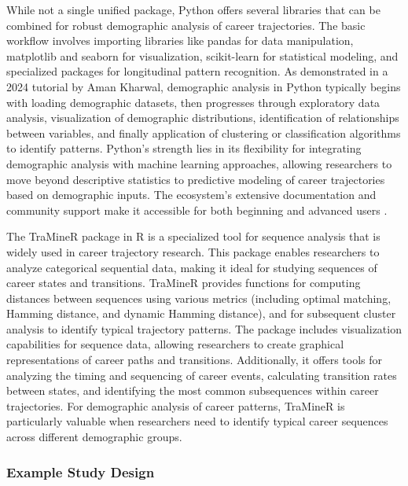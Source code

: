 \documentclass[../main.tex]{subfiles}
\begin{document}
While not a single unified package, Python offers several libraries that can be combined for robust demographic analysis of career trajectories. The basic workflow involves importing libraries like pandas for data manipulation, matplotlib and seaborn for visualization, scikit-learn for statistical modeling, and specialized packages for longitudinal pattern recognition. As demonstrated in a 2024 tutorial by Aman Kharwal, demographic analysis in Python typically begins with loading demographic datasets, then progresses through exploratory data analysis, visualization of demographic distributions, identification of relationships between variables, and finally application of clustering or classification algorithms to identify patterns. Python's strength lies in its flexibility for integrating demographic analysis with machine learning approaches, allowing researchers to move beyond descriptive statistics to predictive modeling of career trajectories based on demographic inputs. The ecosystem's extensive documentation and community support make it accessible for both beginning and advanced users \citep{kharwal2024demographics}.


The TraMineR package in R is a specialized tool for sequence analysis that is widely used in career trajectory research. This package enables researchers to analyze categorical sequential data, making it ideal for studying sequences of career states and transitions. TraMineR provides functions for computing distances between sequences using various metrics (including optimal matching, Hamming distance, and dynamic Hamming distance), and for subsequent cluster analysis to identify typical trajectory patterns. The package includes visualization capabilities for sequence data, allowing researchers to create graphical representations of career paths and transitions. Additionally, it offers tools for analyzing the timing and sequencing of career events, calculating transition rates between states, and identifying the most common subsequences within career trajectories. For demographic analysis of career patterns, TraMineR is particularly valuable when researchers need to identify typical career sequences across different demographic groups.

\subsubsection{Example Study Design}

\end{document}
